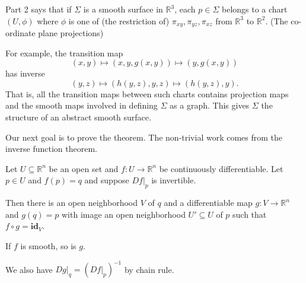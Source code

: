 \begin{remark}
    Part 2 says that if \(\Sigma\) is a smooth surface in \(\mathbb{R}^3\), each \(p \in \Sigma\) belongs to a chart \((U, \phi)\) where \(\phi\) is one of (the restriction of) \(\pi_{xy},\pi_{yz},\pi_{xz}\) from \(\mathbb{R}^3\) to \(\mathbb{R}^2\). (The co-ordinate plane projections)

    For example, the transition map
    \[
        (x,y) \mapsto (x,y,g(x,y)) \mapsto (y,g(x,y))
    \]
    has inverse
    \[
        (y,z) \mapsto (h(y,z),y,z) \mapsto (h(y,z),y).
    \]
    That is, all the transition maps between such charts contains projection maps and the smooth maps involved in defining \(\Sigma\) as a graph. This gives \(\Sigma\) the structure of an abstract smooth surface.
\end{remark}

Our next goal is to prove the theorem. The non-trivial work comes from the inverse function theorem.
\begin{theorem}
    Let \(U\subseteq \mathbb{R}^n\) be an open set and \(f: U \to \mathbb{R}^n\) be continuously differentiable. Let \(p \in U\) and \(f(p) = q\) and suppose \(\left. Df \right|_p\) is invertible.

    Then there is an open neighborhood \(V\) of \(q\) and a differentiable map \(g: V \to \mathbb{R}^n\) and \(g(q) = p\) with image an open neighborhood \(U' \subseteq U\) of \(p\) such that \(f \circ g = \textbf{id}_V\). 

    If \(f\) is smooth, so is \(g\).
\end{theorem}
\begin{remark}
    We also have \(\left.Dg\right|_q = (\left.Df\right|_p)^{-1}\) by chain rule.
\end{remark}